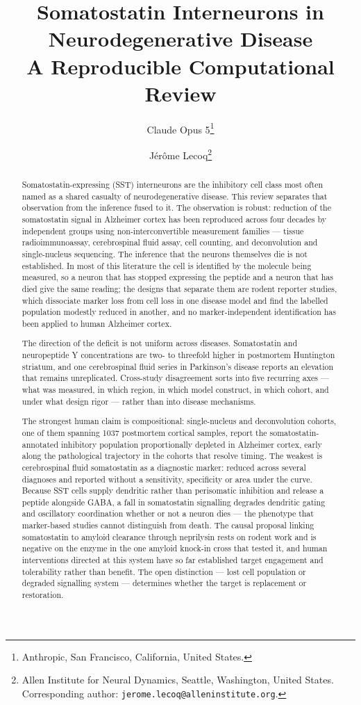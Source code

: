 \documentclass[11pt]{article}
\title{Somatostatin Interneurons in Neurodegenerative Disease\\
\large A Reproducible Computational Review}
\author{Claude Opus 5\thanks{Anthropic, San Francisco, California, United States.}
\and J\'er\^ome Lecoq\thanks{Allen Institute for Neural Dynamics, Seattle, Washington, United States.
Corresponding author: \texttt{jerome.lecoq@alleninstitute.org}.}}
\date{}
\begin{document}
\maketitle

\begin{abstract}
Somatostatin-expressing (SST) interneurons are the inhibitory cell class most often named as a shared casualty of neurodegenerative disease. This review separates that observation from the inference fused to it. The observation is robust: reduction of the somatostatin signal in Alzheimer cortex has been reproduced across four decades by independent groups using non-interconvertible measurement families --- tissue radioimmunoassay, cerebrospinal fluid assay, cell counting, and deconvolution and single-nucleus sequencing. The inference that the neurons themselves die is not established. In most of this literature the cell is identified by the molecule being measured, so a neuron that has stopped expressing the peptide and a neuron that has died give the same reading; the designs that separate them are rodent reporter studies, which dissociate marker loss from cell loss in one disease model and find the labelled population modestly reduced in another, and no marker-independent identification has been applied to human Alzheimer cortex.

The direction of the deficit is not uniform across diseases. Somatostatin and neuropeptide Y concentrations are two- to threefold higher in postmortem Huntington striatum, and one cerebrospinal fluid series in Parkinson's disease reports an elevation that remains unreplicated. Cross-study disagreement sorts into five recurring axes --- what was measured, in which region, in which model construct, in which cohort, and under what design rigor --- rather than into disease mechanisms.

The strongest human claim is compositional: single-nucleus and deconvolution cohorts, one of them spanning 1037 postmortem cortical samples, report the somatostatin-annotated inhibitory population proportionally depleted in Alzheimer cortex, early along the pathological trajectory in the cohorts that resolve timing. The weakest is cerebrospinal fluid somatostatin as a diagnostic marker: reduced across several diagnoses and reported without a sensitivity, specificity or area under the curve. Because SST cells supply dendritic rather than perisomatic inhibition and release a peptide alongside GABA, a fall in somatostatin signalling degrades dendritic gating and oscillatory coordination whether or not a neuron dies --- the phenotype that marker-based studies cannot distinguish from death. The causal proposal linking somatostatin to amyloid clearance through neprilysin rests on rodent work and is negative on the enzyme in the one amyloid knock-in cross that tested it, and human interventions directed at this system have so far established target engagement and tolerability rather than benefit. The open distinction --- lost cell population or degraded signalling system --- determines whether the target is replacement or restoration.
\end{abstract}
\end{document}
